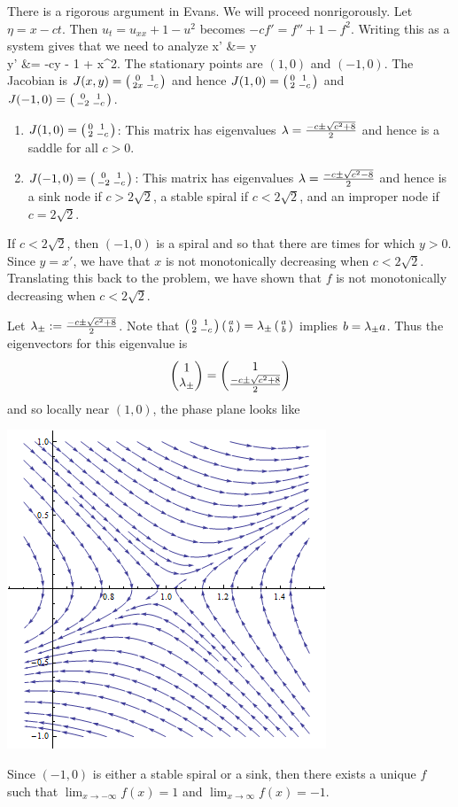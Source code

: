 \label{f084}
There is a rigorous argument in Evans. We will proceed nonrigorously. Let $\eta = x - ct$. Then $u_t = u_{xx} + 1 - u^2$ becomes
$-cf' = f'' + 1 - f^2$. Writing this as a system gives that we need to analyze
\ba
x' &= y\\
y' &= -cy - 1 + x^2.
\ea
The stationary points are $(1, 0)$ and $(-1, 0)$.
The Jacobian is $J(x, y) = \left(\begin{smallmatrix} 0 & 1 \\ 2x & -c\end{smallmatrix}\right)$ and hence $J(1, 0) = \left(\begin{smallmatrix} 0 & 1 \\ 2 & -c\end{smallmatrix}\right)$ and $J(-1, 0) = \left(\begin{smallmatrix} 0 & 1 \\ -2 & -c\end{smallmatrix}\right)$.
\begin{enumerate}[$(i)$]
\item $J(1, 0) = \left(\begin{smallmatrix} 0 & 1 \\ 2 & -c\end{smallmatrix}\right)$: This matrix has eigenvalues $\lambda = \frac{-c \pm \sqrt{c^2 + 8}}{2}$ and hence is a saddle
for all $c > 0$.
\item $J(-1, 0) = \left(\begin{smallmatrix} 0 & 1 \\ -2 & -c\end{smallmatrix}\right)$: This matrix has eigenvalues $\lambda = \frac{-c \pm \sqrt{c^2 - 8}}{2}$ and hence
is a sink node if $c > 2\sqrt{2}$, a stable spiral if $c < 2\sqrt{2}$, and an improper node if $c = 2\sqrt{2}$.
\end{enumerate}
If $c < 2\sqrt{2}$, then $(-1, 0)$ is a spiral and so that there are times for which $y > 0$.
Since $y = x'$, we have that $x$ is not monotonically decreasing when $c < 2\sqrt{2}$. Translating this back to the problem,
we have shown that $f$ is not monotonically decreasing when $c < 2\sqrt{2}$.

Let $\lambda_{\pm} := \frac{-c \pm \sqrt{c^2 + 8}}{2}$. Note that $\left(\begin{smallmatrix} 0 & 1 \\ 2 & -c\end{smallmatrix}\right)\left(\begin{smallmatrix} a \\ b\end{smallmatrix}\right) = \lambda_{\pm}\left(\begin{smallmatrix} a \\ b\end{smallmatrix}\right)$ implies
$b = \lambda_{\pm}a$. Thus the eigenvectors for this eigenvalue is $$\begin{pmatrix} 1 \\ \lambda_{\pm}\end{pmatrix} = \begin{pmatrix} 1 \\ \frac{-c \pm \sqrt{c^2 + 8}}{2}\end{pmatrix}$$
and so locally near $(1, 0)$, the phase plane looks like
\begin{center}
\includegraphics[scale=0.75]{./_Figures/F08Q4.png}
\end{center}
Since $(-1, 0)$ is either a stable spiral or a sink, then there exists a unique $f$ such that $\lim_{x \rightarrow -\infty}f(x) = 1$
and $\lim_{x \rightarrow \infty}f(x) = -1$.
\hq

